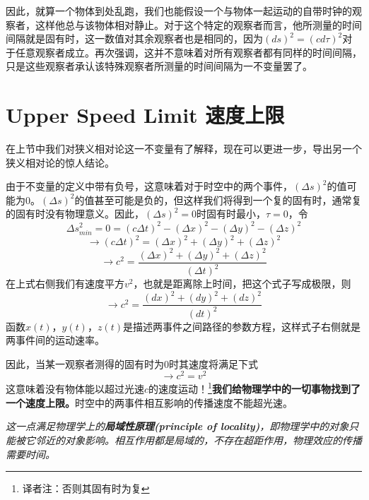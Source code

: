 因此，就算一个物体到处乱跑，我们也能假设一个与物体一起运动的自带时钟的观察者，这样他总与该物体相对静止。对于这个特定的观察者而言，他所测量的时间间隔就是固有时，这一数值对其余观察者也是相同的，因为$(ds)^2=(cd\tau)^2$对于任意观察者成立。再次强调，这并不意味着对所有观察者都有同样的时间间隔，只是这些观察者承认该特殊观察者所测量的时间间隔为一不变量罢了。

\section[速度上限]{Upper Speed Limit \quad 速度上限}
\label{sec2.3}
在上节中我们对狭义相对论这一不变量有了解释，现在可以更进一步，导出另一个狭义相对论的惊人结论。

由于不变量的定义中带有负号，这意味着对于时空中的两个事件，$(\Delta s)^2$的值可能为0。$(\Delta s)^2$的值甚至可能是负的，但这样我们将得到一个复的固有时，通常复的固有时没有物理意义。因此，$(\Delta s)^2=0$时固有时最小，$\tau=0$，令
\[
\Delta s^2_{min}
=0=(c \Delta t)^2-(\Delta x)^2-(\Delta y)^2-(\Delta z)^2
\]
\[
\rightarrow (c \Delta t)^2
=(\Delta x)^2+(\Delta y)^2+(\Delta z)^2
\]
\begin{equation}\label{equ2.20}
 \rightarrow c^2=
  \frac{(\Delta x)^2+(\Delta y)^2+(\Delta z)^2}{(\Delta t)^2}
\end{equation}
在上式右侧我们有速度平方$v^2$，也就是距离除上时间，把这个式子写成极限，则
\begin{equation}\label{equ2.21}
 \rightarrow c^2=\frac{(d x)^2+(d y)^2+(d z)^2}{(dt)^2}
\end{equation}
函数$x(t)$，$y(t)$，$z(t)$是描述两事件之间路径的参数方程，这样式子右侧就是两事件间的运动速率。

因此，当某一观察者测得的固有时为$0$时其速度将满足下式
\begin{equation}\label{equ2.22}
  \rightarrow c^2 =v^2
\end{equation}
这意味着没有物体能以超过光速$c$的速度运动！\footnote{译者注：否则其固有时为复}{\bf{我们给物理学中的一切事物找到了一个速度上限。}}时空中的两事件相互影响的传播速度不能超光速。

{\it{这一点满足物理学上的{\bf{局域性原理(principle of locality)}}，即物理学中的对象只能被它邻近的对象影响。相互作用都是局域的，不存在超距作用，物理效应的传播需要时间。}}

